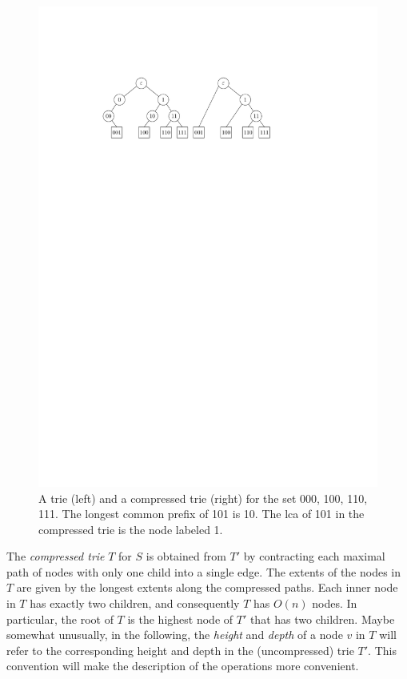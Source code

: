 \documentclass[a4paper,11pt]{article}
\newcommand{\?}{\mskip1.5mu}
\begin{document}
\begin{figure}
  \centering
  \includegraphics{trie}
  \caption{A trie (left) and a compressed trie (right) for the set 
  000, 100, 110, 111. The longest common prefix of 101 is  10. The 
  lca of 101 in the compressed trie
    is the node labeled 1.}
  \label{fig:trie}
\end{figure}

The \emph{compressed trie} $T$ for $S$ is obtained
from $T'$ by contracting each maximal path of nodes
with only one child into a single edge. 
The extents of the nodes in $T$ are given by the longest 
extents along the compressed paths.
Each inner node in $T$ has exactly two children, and
consequently $T$ has $O(n)$ nodes.
In particular, the root of $T$ is the highest node of $T'$
that has two children.
Maybe somewhat unusually, in the following, the 
\emph{height} and \emph{depth} of a node $v$ in $T$ 
will refer to the corresponding
height and depth in the (uncompressed) trie $T'$.
This convention will make the description of the operations more
convenient.
\end{document}
